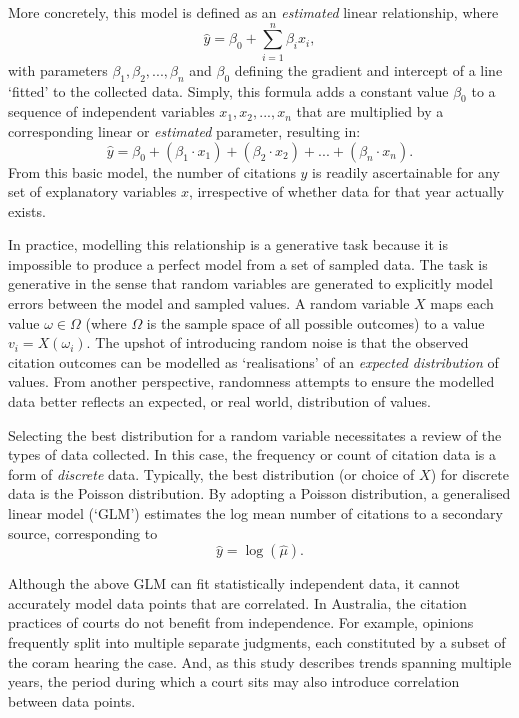 More concretely, this model is defined as an \textit{estimated} linear relationship, where \[\hat{y} = \beta_0 + \sum_{i=1}^{n} \beta_ix_i,\]
with parameters $\beta_1, \beta_2, ..., \beta_n$ and $\beta_0$ defining the gradient and intercept of a line `fitted' to the collected data. Simply, this formula adds a constant value $\beta_0$ to a sequence of independent variables $x_1, x_2, ..., x_n$ that are multiplied by a corresponding linear or \textit{estimated} parameter, resulting in: \[\hat{y} = \beta_0 + (\beta_1 \cdot x_1) + (\beta_2 \cdot x_2) + ... + (\beta_n \cdot x_n).\] From this basic model, the number of citations $y$ is readily ascertainable for any set of explanatory variables $x$, irrespective of whether data for that year actually exists.

In practice, modelling this relationship is a generative task because it is impossible to produce a perfect model from a set of sampled data. The task is generative in the sense that random variables are generated to explicitly model errors between the model and sampled values. A random variable $X$ maps each value $\omega \in \Omega$ (where $\Omega$ is the sample space of all possible outcomes) to a value $v_i = X(\omega_i)$. The upshot of introducing random noise is that the observed citation outcomes can be modelled as `realisations' of an \textit{expected distribution} of values. From another perspective, randomness attempts to ensure the modelled data better reflects an expected, or real world, distribution of values.

Selecting the best distribution for a random variable necessitates a review of the types of data collected. In this case, the frequency or count of citation data is a form of \textit{discrete} data. Typically, the best distribution (or choice of $X$) for discrete data is the Poisson distribution. By adopting a Poisson distribution, a generalised linear model (`GLM') estimates the log mean number of citations to a secondary source, corresponding to \[\hat{y} = \log(\hat{\mu}).\]

Although the above GLM can fit statistically independent data, it cannot accurately model data points that are correlated. In Australia, the citation practices of courts do not benefit from independence. For example, opinions frequently split into multiple separate judgments, each constituted by a subset of the coram hearing the case. And, as this study describes trends spanning multiple years, the period during which a court sits may also introduce correlation between data points.

